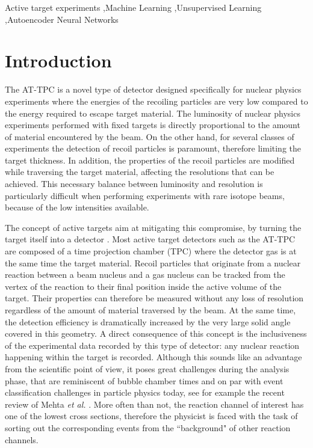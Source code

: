 \documentclass[review,number,sort&compress]{elsarticle}
\begin{document}
\begin{frontmatter}
\begin{keyword}
Active target experiments \sep Machine Learning \sep Unsupervised Learning \sep Autoencoder Neural Networks
\PACS



\end{keyword}

\end{frontmatter}

\section{Introduction}\label{sec:intro}



The AT-TPC \cite{Bradt2017} is a novel type of detector designed specifically for nuclear physics experiments where the energies of the recoiling particles are very low compared to the energy required to escape target material. The luminosity of nuclear physics experiments performed with fixed targets is directly proportional to the amount of material encountered by the beam. On the other hand, for several classes of experiments the detection of recoil particles is paramount, therefore limiting the target thickness. In addition, the properties of the recoil particles are modified while traversing the target material, affecting the resolutions that can be achieved. This necessary balance between luminosity and resolution is particularly difficult when performing experiments with rare isotope beams, because of the low intensities available. 

The concept of active targets aim at mitigating this compromise, by turning the target itself into a detector \cite{BECEIRONOVO2015}. Most active target detectors such as the AT-TPC are composed of a time projection chamber (TPC) where the detector gas is at the same time the target material. Recoil particles that originate from a nuclear reaction between a beam nucleus and a gas nucleus can be tracked from the vertex of the reaction to their final position inside the active volume of the target. Their properties can therefore be measured without any loss of resolution regardless of the amount of material traversed by the beam. At the same time, the detection efficiency is dramatically increased by the very large solid angle covered in this geometry. A direct consequence of this concept is the inclusiveness of the experimental data recorded by this type of detector: any nuclear reaction happening within the target is recorded. Although this sounds like an advantage from the scientific point of view, it poses great challenges during the analysis phase, that are reminiscent of bubble chamber times and on par with event classification challenges in particle physics today, see for example the recent review of Mehta {\em et al.} \cite{mehta2019}. More often than not, the reaction channel of interest has one of the lowest cross sections, therefore the physicist is faced with the task of sorting out the corresponding events from the ``background" of other reaction channels. 
\end{document}
